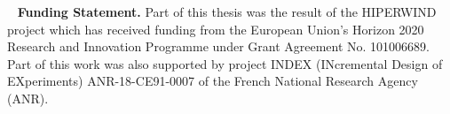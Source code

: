 {
\thispagestyle{plain}
~
\vfill
\footnotesize
\noindent
\textbf{Funding Statement.}
Part of this thesis was the result of the HIPERWIND project which has received funding from the European Union’s Horizon 2020 Research and Innovation Programme under Grant Agreement No. 101006689. 
Part of this work was also supported by project INDEX (INcremental Design of EXperiments) ANR-18-CE91-0007 of the French National Research Agency (ANR).
}